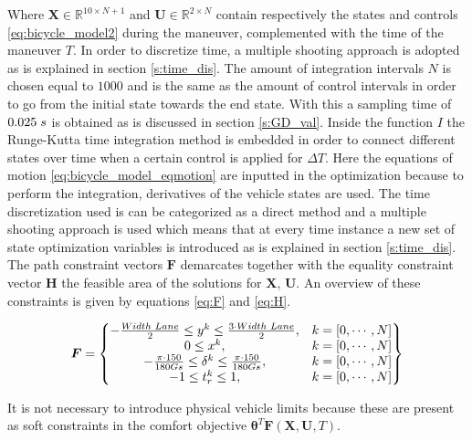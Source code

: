 Where $\bm{X} \in \mathbb{R}^{10\times N+1}$ and $\bm{U}\in \mathbb{R}^{2\times N}$ contain respectively the states and controls  \ref{eq:bicycle_model2} during the maneuver, complemented with the time of the maneuver $T$. In order to discretize time, a multiple shooting approach is adopted as is explained in section \ref{s:time_dis}. The amount of integration intervals $N$ is chosen equal to $1000$ and is the same as the amount of control intervals in order to go from the initial state towards the end state. With this a sampling time of $0.025 \hspace{1mm}s$ is obtained as is discussed in section \ref{s:GD_val}.  Inside the function $I$ the Runge-Kutta time integration method is embedded in order to connect different states over time when a certain control is applied for $\Delta T$. Here the equations of motion \ref{eq:bicycle_model_eqmotion} are inputted in the optimization because to perform the integration, derivatives of the vehicle states are used. The time discretization used is can be categorized as a direct method and a multiple shooting approach is used which means that at every time instance a new set of state optimization variables is introduced as is explained in section \ref{s:time_dis}. The path constraint vectors $\bm{F}$ demarcates together with the equality constraint vector $\bm{H}$ the feasible area of the solutions for $\bm{X}$, $\bm{U}$. An overview of these constraints is given by equations \ref{eq:F} and \ref{eq:H}.

\begin{equation}\label{eq:F}
\bm{F} =
\begin{Bmatrix}
-\frac{Width\hspace{1mm}Lane}{2} \leq y^k \leq \frac{3\cdot Width\hspace{1mm}Lane}{2}, & k = [0,\cdots, N] \\
0 \leq x^k, & k = [0,\cdots, N] \\
-\frac{\pi\cdot 150}{180 Gs} \leq \delta^k \leq \frac{\pi\cdot 150}{180 Gs}, & k = [0,\cdots, N] \\
-1 \leq t_r^k \leq 1, & k = [0,\cdots, N]

\end{Bmatrix}
\end{equation}

It is not necessary to introduce physical vehicle limits because these are present as soft constraints in the comfort objective $\bm{\theta}^T\bm{F}(\bm{X},\bm{U}, T)$.

